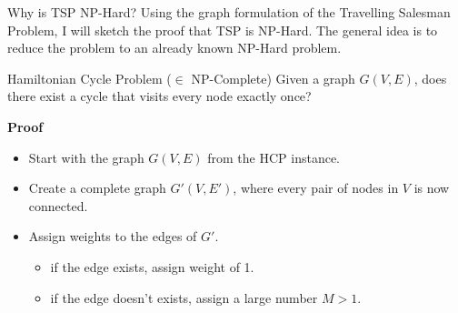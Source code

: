 \documentclass[aspectratio=169,xcolor=dvipsnames, t]{beamer}
\begin{document}
\begin{frame}{Why is TSP NP-Hard?}
	\vspace{-5mm}
	Using the graph formulation of the Travelling Salesman Problem, I will sketch the proof that TSP is NP-Hard. The general idea is to reduce the problem to an already known NP-Hard problem.

	\begin{block}{Hamiltonian Cycle Problem (\( \in \) NP-Complete)}
		Given a graph \( G(V, E) \), does there exist a cycle that visits every node exactly once?
	\end{block}


	\textbf{Proof}
		\begin{itemize}
			\item<4-> Start with the graph \( G(V, E) \) from the HCP instance.
			\item<5-> Create a complete graph \( G'(V, E') \), where every pair of nodes in \( V \) is now connected.
			\item<6-> Assign weights to the edges of \( G' \).
				\begin{itemize}
					\item<7-> if the edge exists, assign weight of 1.
					\item<8-> if the edge doesn't exists, assign a large number \(M > 1\).
				\end{itemize}
		\end{itemize}
\end{frame}
\end{document}
